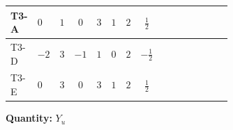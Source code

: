 \documentclass[8pt]{article}
\begin{document}
\begin{landscape}
\begin{longtable}{@{}llcccccc >{\raggedright\arraybackslash}p{0.21\linewidth} >{\raggedright\arraybackslash}p{0.21\linewidth} >{\raggedright\arraybackslash}p{0.21\linewidth}@{}}
\midrule
T3-A & $0$ & $1$ & $0$ & $3$ & $1$ & $2$ & $\frac{1}{2}$ & \scriptsize\adjustbox{max width=\linewidth}{$\begin{gathered} -\frac{3}{2} (\left({Y_d}\,\left({Y_d}\right)^{\dagger}\,{Y_u}\right)_{ij}-\left({Y_u}\,\left({Y_u}\right)^{\dagger}\,{Y_u}\right)_{ij})\end{gathered}$} & \scriptsize\adjustbox{max width=\linewidth}{$\begin{gathered} -\frac{9}{4} {g_2}^2 \left({Y_u}\right)_{ij}\end{gathered}$} & \scriptsize\adjustbox{max width=\linewidth}{$\begin{gathered} -8 {g_3}^2 \left({Y_u}\right)_{ij}\end{gathered}$} \\
\midrule
T3-D & $-2$ & $3$ & $-1$ & $1$ & $0$ & $2$ & $-\frac{1}{2}$ & \scriptsize\adjustbox{max width=\linewidth}{$\begin{gathered} -\frac{3}{2} (\left({Y_d}\,\left({Y_d}\right)^{\dagger}\,{Y_u}\right)_{ij}-\left({Y_u}\,\left({Y_u}\right)^{\dagger}\,{Y_u}\right)_{ij})\end{gathered}$} & \scriptsize\adjustbox{max width=\linewidth}{$\begin{gathered} -\frac{9}{4} {g_2}^2 \left({Y_u}\right)_{ij}\end{gathered}$} & \scriptsize\adjustbox{max width=\linewidth}{$\begin{gathered} -8 {g_3}^2 \left({Y_u}\right)_{ij}\end{gathered}$} \\
\midrule
T3-E & $0$ & $3$ & $0$ & $3$ & $1$ & $2$ & $\frac{1}{2}$ & \scriptsize\adjustbox{max width=\linewidth}{$\begin{gathered} -\frac{3}{2} (\left({Y_d}\,\left({Y_d}\right)^{\dagger}\,{Y_u}\right)_{ij}-\left({Y_u}\,\left({Y_u}\right)^{\dagger}\,{Y_u}\right)_{ij})\end{gathered}$} & \scriptsize\adjustbox{max width=\linewidth}{$\begin{gathered} -\frac{9}{4} {g_2}^2 \left({Y_u}\right)_{ij}\end{gathered}$} & \scriptsize\adjustbox{max width=\linewidth}{$\begin{gathered} -8 {g_3}^2 \left({Y_u}\right)_{ij}\end{gathered}$} \\
\midrule
\bottomrule
\end{longtable}
\clearpage
\noindent\textbf{Quantity: }$Y_u$\par\smallskip

\end{landscape}
\end{document}
